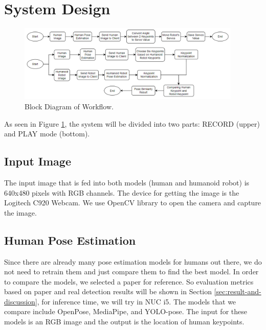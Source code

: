 \section{System Design}
\label{sec:systemdesign}

\begin{figure}[ht]
  \centering
  \includegraphics[width=0.95\textwidth]{gambar/methodology.png}
  \caption{Block Diagram of Workflow.}
  \label{fig:block-diagram}
\end{figure}

As seen in Figure \ref{fig:block-diagram}, the system will be divided into two parts: RECORD (upper) and PLAY mode (bottom).


\subsection{Input Image}
\label{subsec:input-image}

The input image that is fed into both models (human and humanoid robot) is 640x480 pixels with RGB channels. The device for getting the image is the Logitech C920 Webcam. We use OpenCV library to open the camera and capture the image.


\subsection{Human Pose Estimation}
\label{subsec:human-pose-estimation}

Since there are already many pose estimation models for humans out there, we do not need to retrain them and just compare them to find the best model. In order to compare the models, we selected a paper for reference.
So evaluation metrics based on paper and real detection results will be shown in Section \ref{sec:result-and-discussion}, for inference time, we will try in NUC i5. The models that we compare include OpenPose, MediaPipe, and YOLO-pose.
The input for these models is an RGB image and the output is the location of human keypoints.


